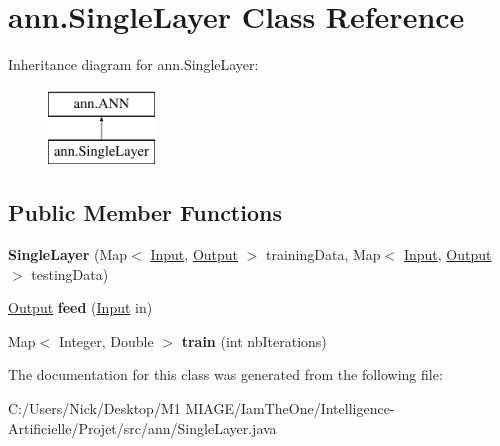 \hypertarget{classann_1_1_single_layer}{}\section{ann.\+Single\+Layer Class Reference}
\label{classann_1_1_single_layer}
Inheritance diagram for ann.\+Single\+Layer\+:\begin{figure}[H]
\begin{center}
\leavevmode
\includegraphics[height=2.000000cm]{classann_1_1_single_layer}
\end{center}
\end{figure}
\subsection*{Public Member Functions}
\begin{DoxyCompactItemize}
\item 
\mbox{\label{classann_1_1_single_layer_ab973ce83e94cfcc1250ca95434950169}} 
{\bfseries Single\+Layer} (Map$<$ \hyperlink{classann_1_1_input}{Input}, \hyperlink{classann_1_1_output}{Output} $>$ training\+Data, Map$<$ \hyperlink{classann_1_1_input}{Input}, \hyperlink{classann_1_1_output}{Output} $>$ testing\+Data)
\item 
\mbox{\label{classann_1_1_single_layer_abf681b102523232e632803dc563bdc07}} 
\hyperlink{classann_1_1_output}{Output} {\bfseries feed} (\hyperlink{classann_1_1_input}{Input} in)
\item 
\mbox{\label{classann_1_1_single_layer_ab03a33e2da33f038384dc51284b22f23}} 
Map$<$ Integer, Double $>$ {\bfseries train} (int nb\+Iterations)
\end{DoxyCompactItemize}


The documentation for this class was generated from the following file\+:\begin{DoxyCompactItemize}
\item 
C\+:/\+Users/\+Nick/\+Desktop/\+M1 M\+I\+A\+G\+E/\+Iam\+The\+One/\+Intelligence-\/\+Artificielle/\+Projet/src/ann/Single\+Layer.\+java\end{DoxyCompactItemize}
